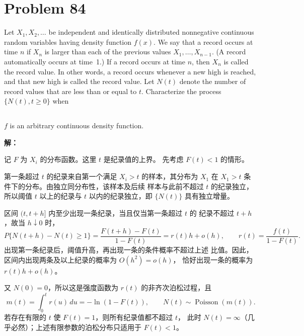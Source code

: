 \documentclass[12pt,a4paper]{article}
\begin{document}
\clearpage
\section{Problem 84}

Let $X_1, X_2, \ldots$ be independent and identically distributed nonnegative
continuous random variables having density function $f(x)$. We say that a
record occurs at time $n$ if $X_n$ is larger than each of the previous values
$X_1, \ldots, X_{n-1}$. (A record automatically occurs at time~1.)
If a record occurs at time $n$, then $X_n$ is called the record value.
In other words, a record occurs whenever a new high is reached, and that
new high is called the record value. Let $N(t)$ denote the number of record
values that are less than or equal to $t$. Characterize the process
$\{N(t), t \ge 0\}$ when

\subsection{}
$f$ is an arbitrary continuous density function.

\begin{answerbox}
\textbf{解：}

记 $F$ 为 $X_i$ 的分布函数。这里 $t$ 是纪录值的上界。
先考虑 $F(t)<1$ 的情形。

第一条超过 $t$ 的纪录来自第一个满足 $X_i>t$ 的样本，其分布为
$X_1$ 在 $X_1>t$ 条件下的分布。由独立同分布性，该样本及后续
样本与此前不超过 $t$ 的纪录独立，所以阈值 $t$ 以上的纪录与
$t$ 以内的纪录独立，即 $\{N(t)\}$ 具有独立增量。

区间 $(t,t+h]$ 内至少出现一条纪录，当且仅当第一条超过 $t$ 的
纪录不超过 $t+h$，故当 $h\downarrow0$ 时，
$$
P\{N(t+h)-N(t)\ge1\}
=\frac{F(t+h)-F(t)}{1-F(t)}
=r(t)h+o(h),
\qquad r(t)=\frac{f(t)}{1-F(t)}.
$$
出现第一条纪录后，阈值升高，再出现一条的条件概率不超过上述
比值。因此，区间内出现两条及以上纪录的概率为 $O(h^2)=o(h)$，
恰好出现一条的概率为 $r(t)h+o(h)$。

又 $N(0)=0$，所以这是强度函数为 $r(t)$ 的非齐次泊松过程，且
$$
m(t)=\int_0^t r(u)\,du=-\ln(1-F(t)),
\qquad N(t)\sim\operatorname{Poisson}(m(t)).
$$
若存在有限的 $t$ 使 $F(t)=1$，则所有纪录值都不超过 $t$，
此时 $N(t)=\infty$（几乎必然）；上述有限参数的泊松分布只适用于 $F(t)<1$。

\end{answerbox}

\subsection{}
\end{document}
